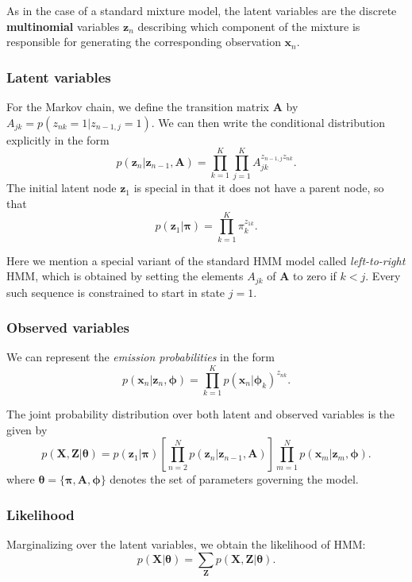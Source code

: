 \documentclass[a4paper]{book}
\renewcommand{\bf}{\mathbf}
\newcommand{\imp}[1]{\textit{#1}}
\newcommand{\bs}{\boldsymbol}
\begin{document}
As in the case of a standard mixture model, the latent variables are the discrete \textbf{multinomial} variables $\bf{z}_n$ describing which component of the mixture is responsible for generating the corresponding observation $\bf{x}_n$. 

\subsubsection{Latent variables}
For the Markov chain, we define the transition matrix $\bf{A}$ by $A_{jk} = p(z_{nk}=1|z_{n-1,j}=1)$. We can then write the conditional distribution explicitly in the form
\begin{equation}
	p(\bf{z}_n|\bf{z}_{n-1},\bf{A}) = \prod_{k=1}^K \prod_{j=1}^K A_{jk}^{z_{n-1,j}z_{nk}}.
\end{equation}
The initial latent node $\bf{z}_1$ is special in that it does not have a parent node, so that
\begin{equation}
	p(\bf{z}_1|\bs{\pi}) = \prod_{k=1}^K \pi_k^{z_{1k}}.
\end{equation}

Here we mention a special variant of the standard HMM model called \imp{left-to-right} HMM, which is obtained by setting the elements $A_{jk}$ of $\bf{A}$ to zero if $k<j$. Every such sequence is constrained to start in state $j=1$.
\subsubsection{Observed variables}
We can represent the \imp{emission probabilities} in the form
\begin{equation}
	p(\bf{x}_n|\bf{z}_n,\bs{\phi}) = \prod_{k=1}^K p(\bf{x}_n|\bs{\phi}_k)^{z_{nk}}.
\end{equation}

The joint probability distribution over both latent and observed variables is the given by
\begin{equation}
	p(\bf{X,Z}|\bs{\theta}) = p(\bf{z}_1|\bs{\pi})\left[\prod_{n=2}^N p(\bf{z}_n|\bf{z}_{n-1},\bf{A})\right] \prod_{m=1}^N p(\bf{x}_m|\bf{z}_m,\bs{\phi}).
\end{equation}
where $\bs{\theta}=\{ \bs{\pi},\bf{A},\bs{\phi} \}$ denotes the set of parameters governing the model.

\subsubsection{Likelihood}
Marginalizing over the latent variables, we obtain the likelihood of HMM:
\begin{equation}
	p(\bf{X}|\bs{\theta}) = \sum_{\bf{Z}} p(\bf{X,Z}|\bs{\theta}).
\end{equation}
\end{document}
